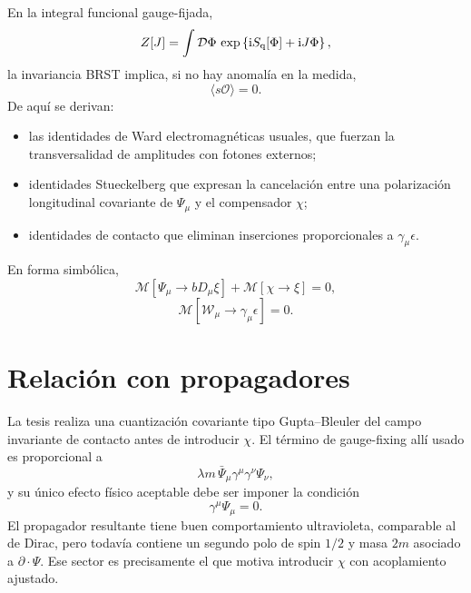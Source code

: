 \documentclass[11pt,a4paper]{article}
\numberwithin{equation}{section}
\newcommand{\Wcal}{\mathcal W}
\newcommand{\ii}{\mathrm i}
\begin{document}
En la integral funcional gauge-fijada,
\begin{equation}
Z[J]=\int\mathcal D\Phi\,\exp\left\{\ii S_{\rm q}[\Phi]+\ii J\Phi\right\},
\end{equation}
la invariancia BRST implica, si no hay anomalía en la medida,
\begin{equation}
\langle s\mathcal O\rangle=0.
\end{equation}
De aquí se derivan:
\begin{itemize}
\item las identidades de Ward electromagnéticas usuales, que fuerzan la transversalidad de amplitudes con fotones externos;
\item identidades Stueckelberg que expresan la cancelación entre una polarización longitudinal covariante de $\Psi_\mu$ y el compensador $\chi$;
\item identidades de contacto que eliminan inserciones proporcionales a $\gamma_\mu\epsilon$.
\end{itemize}
En forma simbólica,
\begin{equation}
\mathcal M[\Psi_\mu\to bD_\mu\xi]+\mathcal M[\chi\to\xi]=0,
\end{equation}
\begin{equation}
\mathcal M[\Wcal_\mu\to\gamma_\mu\epsilon]=0.
\end{equation}

\section{Relación con propagadores}
\label{sec:relacion-con-propagadores}

La tesis realiza una cuantización covariante tipo Gupta--Bleuler del campo invariante de contacto antes de introducir $\chi$. El término de gauge-fixing allí usado es proporcional a
\begin{equation}
\lambda m\,\bar\Psi_\mu\gamma^\mu\gamma^\nu\Psi_\nu,
\end{equation}
y su único efecto físico aceptable debe ser imponer la condición
\begin{equation}
\gamma^\mu\Psi_\mu=0.
\end{equation}
El propagador resultante tiene buen comportamiento ultravioleta, comparable al de Dirac, pero todavía contiene un segundo polo de spin $1/2$ y masa $2m$ asociado a $\partial\cdot\Psi$. Ese sector es precisamente el que motiva introducir $\chi$ con acoplamiento ajustado.
\end{document}
